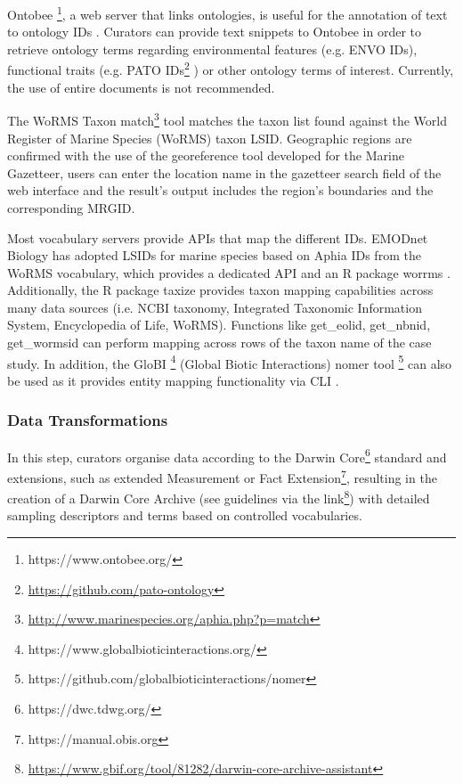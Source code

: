 Ontobee \footnote{https://www.ontobee.org/}, a web server that links
ontologies, is useful for the annotation of text to ontology IDs
\parencite{xiang_ontobee_2011}. Curators can provide text snippets to Ontobee in
order to retrieve ontology terms regarding environmental features (e.g. ENVO
IDs), functional traits (e.g. PATO
IDs\footnote{\url{https://github.com/pato-ontology}} \parencite{tan_pato-ontologypato_2022})
or other ontology terms of interest. Currently, the use of entire documents is
not recommended.

The WoRMS Taxon match\footnote{\url{http://www.marinespecies.org/aphia.php?p=match}}
tool matches the taxon list found against the World Register of Marine Species
(WoRMS) taxon LSID. Geographic regions are confirmed with the use of the
georeference tool developed for the Marine Gazetteer, users can enter the
location name in the gazetteer search field of the web interface and the
result’s output includes the region’s boundaries and the corresponding MRGID.

Most vocabulary servers provide APIs that map the different IDs. EMODnet Biology
has adopted LSIDs for marine species based on Aphia IDs from the
WoRMS vocabulary, which provides a dedicated API and an R package worrms
\parencite{chamberlain_worrms_2020}. Additionally, the R package taxize
\parencite{chamberlain_taxize_2013} provides taxon mapping capabilities across many
data sources (i.e. NCBI taxonomy, Integrated Taxonomic Information System,
Encyclopedia of Life, WoRMS). Functions like get\_eolid, get\_nbnid, get\_wormsid
can perform mapping across rows of the taxon name of the case study. In
addition, the GloBI \footnote{https://www.globalbioticinteractions.org/}
(Global Biotic Interactions) nomer tool
\footnote{https://github.com/globalbioticinteractions/nomer}
\parencite{poelen_globalbioticinteractionsnomer_2022} can also be used as it
provides entity mapping functionality via CLI \parencite{poelen_global_2014}.

   \subsubsection{Data Transformations}
   In this step, curators organise data according to the Darwin
Core\footnote{https://dwc.tdwg.org/} standard and extensions, such as extended
Measurement or Fact Extension\footnote{https://manual.obis.org}, resulting in
the creation of a Darwin Core Archive (see guidelines via the
link\footnote{\url{https://www.gbif.org/tool/81282/darwin-core-archive-assistant}})
with detailed sampling descriptors and terms based on controlled vocabularies.

